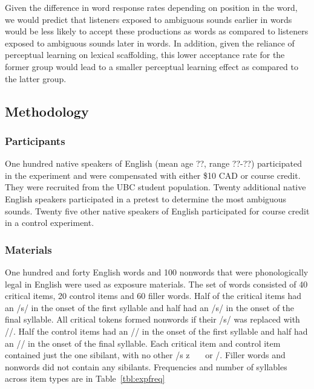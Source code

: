 Given the difference in word response rates depending on position in the word, we would predict that listeners exposed to ambiguous sounds earlier in words would be less likely to accept these productions as words as compared to listeners exposed to ambiguous sounds later in words.  In addition, given the reliance of perceptual learning on lexical scaffolding, this lower acceptance rate for the former group would lead to a smaller perceptual learning effect as compared to the latter group.

\subsection{Methodology}

\subsubsection{Participants}

One hundred native speakers of English (mean age ??, range ??-??) participated in the experiment and were compensated with either \$10 CAD or course credit. They were recruited from the UBC student population.  Twenty additional native English speakers participated in a pretest to determine the most ambiguous sounds.  Twenty five other native speakers of English participated for course credit in a control experiment.

\subsubsection{Materials}

One hundred and forty English words and 100 nonwords that were phonologically legal in English were used as exposure materials.  The set of words consisted of 40 critical items, 20 control items and 60 filler words.  Half of the critical items had an /s/ in the onset of the first syllable and half had an /s/ in the onset of the final syllable.  All critical tokens formed nonwords if their /s/ was replaced with /\textesh/. Half the control items had an /\textesh/ in the onset of the first syllable and half had an /\textesh/ in the onset of the final syllable.  Each critical item and control item contained just the one sibilant, with no other /s z \textesh\ \textyogh\ \textteshlig\  or \textdyoghlig/.  Filler words and nonwords did not contain any sibilants.  Frequencies and number of syllables across item types are in Table~\ref{tbl:expfreq}

